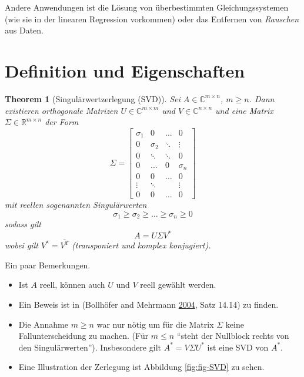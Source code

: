 \documentclass[
]{book}
\providecommand{\tightlist}{%
  \setlength{\itemsep}{0pt}\setlength{\parskip}{0pt}}
\newtheorem{theorem}{Theorem}[chapter]
\theoremstyle{definition}
\theoremstyle{definition}
\theoremstyle{definition}
\theoremstyle{definition}
\theoremstyle{remark}
\begin{document}
Andere Anwendungen ist die Lösung von überbestimmten
Gleichungssystemen (wie sie in der linearen Regression vorkommen) oder das
Entfernen von \emph{Rauschen} aus Daten.

\hypertarget{definition-und-eigenschaften}{%
\section{Definition und Eigenschaften}\label{definition-und-eigenschaften}}

\begin{theorem}[Singulärwertzerlegung (SVD)]
\protect\hypertarget{thm:SVD}{}\label{thm:SVD}Sei \(A\in \mathbb C^{m\times n}\), \(m\geq n\). Dann existieren orthogonale Matrizen \(U \in \mathbb C^{m\times m}\) und \(V\in \mathbb C^{n\times n}\) und eine Matrix \(\Sigma \in \mathbb R^{m\times n}\) der Form
\begin{equation*}
\Sigma = 
\begin{bmatrix}
\sigma_1 & 0 & \dots & 0\\
0 & \sigma_2 &\ddots & \vdots\\
0 & \ddots & \ddots &0\\
  0 & \dots&0 & \sigma_n \\
  0 & 0 & \dots & 0 \\
  \vdots & \ddots &  & \vdots\\
  0 & 0 & \dots & 0
\end{bmatrix}
\end{equation*}
mit reellen sogenannten \emph{Singulärwerten}
\begin{equation*}
\sigma_1 \geq \sigma_2 \geq \dots \geq \sigma_n \geq 0
\end{equation*}
sodass gilt
\begin{equation*}
A = U \Sigma V^*
\end{equation*}
wobei gilt \(V^* = \overline{V^T}\) (transponiert und komplex konjugiert).
\end{theorem}

Ein paar Bemerkungen.

\begin{itemize}
\tightlist
\item
  Ist \(A\) reell, können auch \(U\) und \(V\) reell gewählt werden.
\item
  Ein Beweis ist in (Bollhöfer and Mehrmann \protect\hyperlink{ref-BolM04}{2004}, Satz 14.14) zu finden.
\item
  Die Annahme \(m \geq n\) war nur nötig um für die Matrix \(\Sigma\) keine Fallunterscheidung zu machen. (Für \(m\leq n\) ``steht der Nullblock rechts von den Singulärwerten''). Insbesondere gilt \(A^* = V\Sigma U^*\) ist eine SVD von \(A^*\).
\item
  Eine Illustration der Zerlegung ist Abbildung \ref{fig:fig-SVD} zu sehen.
\end{itemize}
\end{document}

